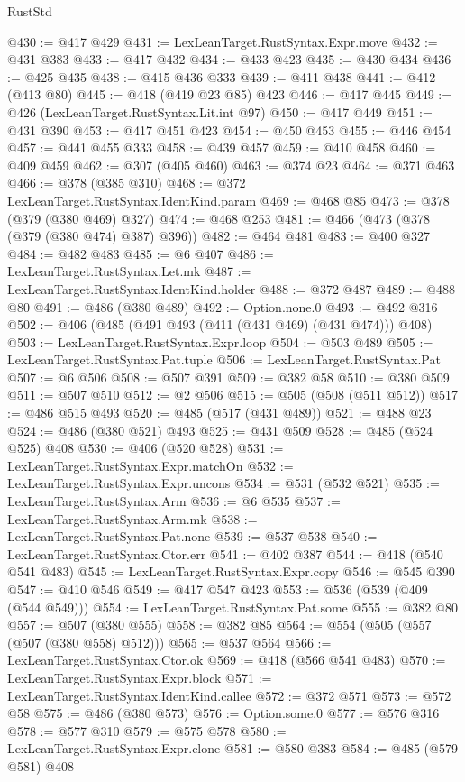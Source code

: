 \begin{lexlean}{RustStd}
\begin{coremodule}
@430 := @417 @429
@431 := LexLeanTarget.RustSyntax.Expr.move
@432 := @431 @383
@433 := @417 @432
@434 := @433 @423
@435 := @430 @434
@436 := @425 @435
@438 := @415 @436 @333
@439 := @411 @438
@441 := @412 (@413 @80)
@445 := @418 (@419 @23 @85) @423
@446 := @417 @445
@449 := @426 (LexLeanTarget.RustSyntax.Lit.int @97)
@450 := @417 @449
@451 := @431 @390
@453 := @417 @451 @423
@454 := @450 @453
@455 := @446 @454
@457 := @441 @455 @333
@458 := @439 @457
@459 := @410 @458
@460 := @409 @459
@462 := @307 (@405 @460)
@463 := @374 @23
@464 := @371 @463
@466 := @378 (@385 @310)
@468 := @372 LexLeanTarget.RustSyntax.IdentKind.param
@469 := @468 @85
@473 := @378 (@379 (@380 @469) @327)
@474 := @468 @253
@481 := @466 (@473 (@378 (@379 (@380 @474) @387) @396))
@482 := @464 @481
@483 := @400 @327
@484 := @482 @483
@485 := @6 @407
@486 := LexLeanTarget.RustSyntax.Let.mk
@487 := LexLeanTarget.RustSyntax.IdentKind.holder
@488 := @372 @487
@489 := @488 @80
@491 := @486 (@380 @489)
@492 := Option.none.{0}
@493 := @492 @316
@502 := @406 (@485 (@491 @493 (@411 (@431 @469) (@431 @474))) @408)
@503 := LexLeanTarget.RustSyntax.Expr.loop
@504 := @503 @489
@505 := LexLeanTarget.RustSyntax.Pat.tuple
@506 := LexLeanTarget.RustSyntax.Pat
@507 := @6 @506
@508 := @507 @391
@509 := @382 @58
@510 := @380 @509
@511 := @507 @510
@512 := @2 @506
@515 := @505 (@508 (@511 @512))
@517 := @486 @515 @493
@520 := @485 (@517 (@431 @489))
@521 := @488 @23
@524 := @486 (@380 @521) @493
@525 := @431 @509
@528 := @485 (@524 @525) @408
@530 := @406 (@520 @528)
@531 := LexLeanTarget.RustSyntax.Expr.matchOn
@532 := LexLeanTarget.RustSyntax.Expr.uncons
@534 := @531 (@532 @521)
@535 := LexLeanTarget.RustSyntax.Arm
@536 := @6 @535
@537 := LexLeanTarget.RustSyntax.Arm.mk
@538 := LexLeanTarget.RustSyntax.Pat.none
@539 := @537 @538
@540 := LexLeanTarget.RustSyntax.Ctor.err
@541 := @402 @387
@544 := @418 (@540 @541 @483)
@545 := LexLeanTarget.RustSyntax.Expr.copy
@546 := @545 @390
@547 := @410 @546
@549 := @417 @547 @423
@553 := @536 (@539 (@409 (@544 @549)))
@554 := LexLeanTarget.RustSyntax.Pat.some
@555 := @382 @80
@557 := @507 (@380 @555)
@558 := @382 @85
@564 := @554 (@505 (@557 (@507 (@380 @558) @512)))
@565 := @537 @564
@566 := LexLeanTarget.RustSyntax.Ctor.ok
@569 := @418 (@566 @541 @483)
@570 := LexLeanTarget.RustSyntax.Expr.block
@571 := LexLeanTarget.RustSyntax.IdentKind.callee
@572 := @372 @571
@573 := @572 @58
@575 := @486 (@380 @573)
@576 := Option.some.{0}
@577 := @576 @316
@578 := @577 @310
@579 := @575 @578
@580 := LexLeanTarget.RustSyntax.Expr.clone
@581 := @580 @383
@584 := @485 (@579 @581) @408

\end{coremodule}
\end{lexlean}
